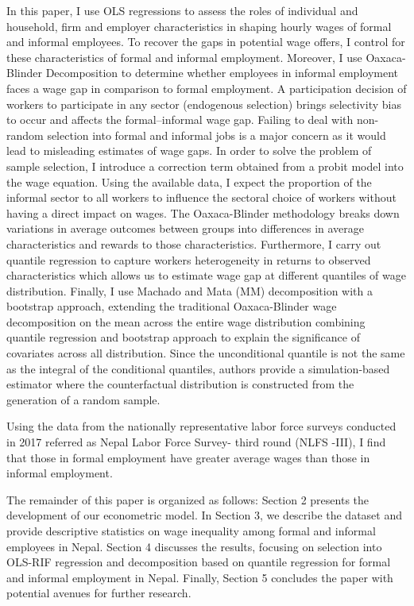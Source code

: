 In this paper, I use OLS regressions to assess the roles of individual and household, firm and employer characteristics in shaping hourly wages of formal and informal employees. To recover the gaps in potential wage offers, I control for these characteristics of formal and informal employment. Moreover, I use Oaxaca-Blinder Decomposition to determine whether employees in informal employment faces a wage gap in comparison to formal employment. A participation decision of workers to participate in any sector (endogenous selection) brings selectivity bias to occur and affects the formal–informal wage gap. Failing to deal with non-random selection into formal and informal jobs is a major concern as it would lead to misleading estimates of wage gaps. In order to solve the problem of sample selection, I introduce a correction term obtained from a probit model into the wage equation. Using the available data, I expect the proportion of the informal sector to all workers to influence the sectoral choice of workers without having a direct impact on wages. The Oaxaca-Blinder methodology breaks down variations in average outcomes between groups into differences in average characteristics and rewards to those characteristics. Furthermore, I carry out quantile regression to capture workers heterogeneity in returns to observed characteristics which allows us to estimate wage gap at different quantiles of wage distribution. Finally, I use Machado and Mata (MM) decomposition with a bootstrap approach, extending the traditional Oaxaca-Blinder wage decomposition on the mean across the entire wage distribution combining quantile regression and bootstrap approach to explain the significance of covariates across all distribution. Since the unconditional quantile is not the same as the integral of the conditional quantiles, authors provide a simulation-based estimator where the counterfactual distribution is constructed from the generation of a random sample.

Using the data from the nationally representative labor force surveys conducted in 2017 referred as Nepal Labor Force Survey- third round (NLFS -III), I find that those in formal employment have greater average wages than those in informal employment. 

The remainder of this paper is organized as follows: Section 2 presents the development of our econometric model. In Section 3, we describe the dataset and provide descriptive statistics on wage inequality among formal and informal employees in Nepal. Section 4 discusses the results, focusing on selection into OLS-RIF regression and decomposition based on quantile regression for formal and informal employment in Nepal. Finally, Section 5 concludes the paper with potential avenues for further research.   





